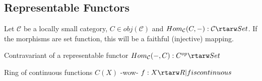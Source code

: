 \subsection{Representable Functors}

Let $\mathcal{C}$ be a locally small category, $ C \in obj(\mathcal{C}) $
and $ Hom_\mathcal{C} (C, -) : \mathcal{C} \rtarw Set $. If the morphisms are set
function, this will be a faithful (injective) mapping.

Contravariant of a representable functor
$ Hom_\mathcal{C}(-, C) : C^{op} \rtarw Set $

Ring of continuous functions $ C(X) $ -wow-
$ {f : X \rtarw R | f is continuous } $